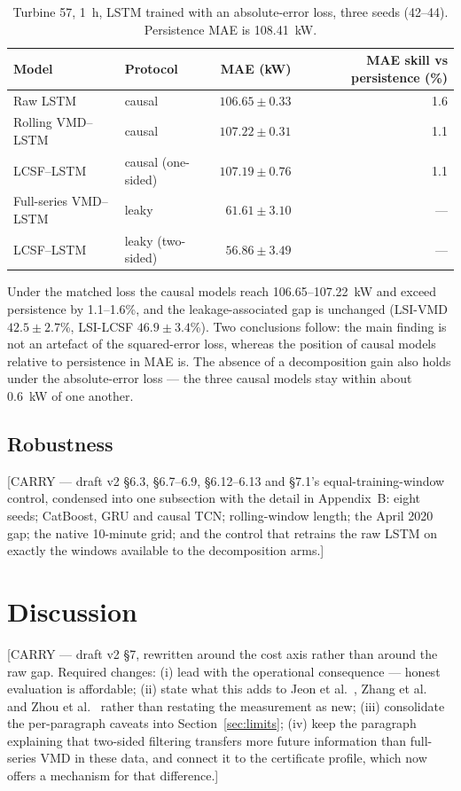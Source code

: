 \documentclass[review,3p,times]{elsarticle}
\newcommand{\carry}[1]{\textsf{\small [CARRY --- #1]}}
\begin{document}
\begin{table}[htbp]\centering
\caption{Turbine 57, 1~h, LSTM trained with an absolute-error loss, three
seeds (42--44). Persistence MAE is 108.41~kW.}
\label{tab:loss}
\footnotesize
\begin{tabular}{llrr}
\toprule
Model & Protocol & MAE (kW) & MAE skill vs persistence (\%) \\
\midrule
Raw LSTM              & causal              & $106.65\pm0.33$ & 1.6 \\
Rolling VMD--LSTM     & causal              & $107.22\pm0.31$ & 1.1 \\
LCSF--LSTM            & causal (one-sided)  & $107.19\pm0.76$ & 1.1 \\
Full-series VMD--LSTM & leaky               & $61.61\pm3.10$  & --- \\
LCSF--LSTM            & leaky (two-sided)   & $56.86\pm3.49$  & --- \\
\bottomrule
\end{tabular}
\end{table}

Under the matched loss the causal models reach 106.65--107.22~kW and exceed
persistence by 1.1--1.6\%, and the leakage-associated gap is unchanged
(LSI-VMD $42.5\pm2.7$\%, LSI-LCSF $46.9\pm3.4$\%). Two conclusions follow: the
main finding is not an artefact of the squared-error loss, whereas the position
of causal models relative to persistence in MAE is. The absence of a
decomposition gain also holds under the absolute-error loss --- the three causal
models stay within about 0.6~kW of one another.

\subsection{Robustness}
\carry{draft v2 §6.3, §6.7--6.9, §6.12--6.13 and §7.1's equal-training-window
control, condensed into one subsection with the detail in Appendix~B: eight
seeds; CatBoost, GRU and causal TCN; rolling-window length; the April 2020 gap;
the native 10-minute grid; and the control that retrains the raw LSTM on
exactly the windows available to the decomposition arms.}

\section{Discussion}\label{sec:discussion}
\carry{draft v2 §7, rewritten around the cost axis rather than around the raw
gap. Required changes: (i) lead with the operational consequence --- honest
evaluation is affordable; (ii) state what this adds to
Jeon et al.~\cite{jeon2026}, Zhang et al.~\cite{zhang2025} and
Zhou et al.~\cite{zhou2024} rather than restating the measurement as new;
(iii) consolidate the per-paragraph caveats into Section~\ref{sec:limits};
(iv) keep the paragraph explaining that two-sided filtering transfers more
future information than full-series VMD in these data, and connect it to the
certificate profile, which now offers a mechanism for that difference.}
\end{document}
